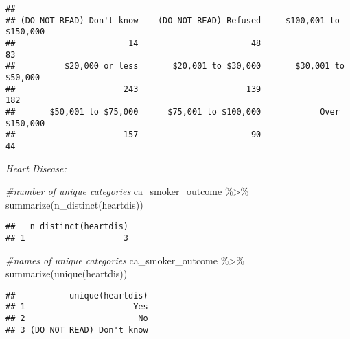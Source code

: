 \documentclass[
]{article}
\newenvironment{Shaded}{\begin{snugshade}}{\end{snugshade}}
\newcommand{\CommentTok}[1]{\textcolor[rgb]{0.56,0.35,0.01}{\textit{#1}}}
\newcommand{\FunctionTok}[1]{\textcolor[rgb]{0.00,0.00,0.00}{#1}}
\newcommand{\NormalTok}[1]{#1}
\newcommand{\SpecialCharTok}[1]{\textcolor[rgb]{0.00,0.00,0.00}{#1}}
\begin{document}
\begin{Shaded}
\end{Shaded}

\begin{verbatim}
## 
## (DO NOT READ) Don't know    (DO NOT READ) Refused     $100,001 to $150,000 
##                       14                       48                       83 
##          $20,000 or less       $20,001 to $30,000       $30,001 to $50,000 
##                      243                      139                      182 
##       $50,001 to $75,000      $75,001 to $100,000            Over $150,000 
##                      157                       90                       44
\end{verbatim}

\emph{Heart Disease:}

\begin{Shaded}
\begin{Highlighting}[]
\CommentTok{\#number of unique categories }
\NormalTok{ca\_smoker\_outcome }\SpecialCharTok{\%\textgreater{}\%} \FunctionTok{summarize}\NormalTok{(}\FunctionTok{n\_distinct}\NormalTok{(heartdis))}
\end{Highlighting}
\end{Shaded}

\begin{verbatim}
##   n_distinct(heartdis)
## 1                    3
\end{verbatim}

\begin{Shaded}
\begin{Highlighting}[]
\CommentTok{\#names of unique categories }
\NormalTok{ca\_smoker\_outcome }\SpecialCharTok{\%\textgreater{}\%} \FunctionTok{summarize}\NormalTok{(}\FunctionTok{unique}\NormalTok{(heartdis))}
\end{Highlighting}
\end{Shaded}

\begin{verbatim}
##           unique(heartdis)
## 1                      Yes
## 2                       No
## 3 (DO NOT READ) Don't know
\end{verbatim}

\begin{Shaded}
\end{Shaded}
\end{document}
